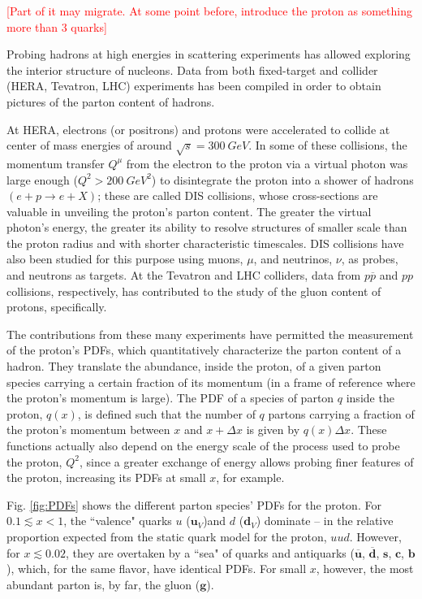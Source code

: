 \textcolor{red}{[Part of it may migrate. At some point before, introduce the proton as something more than 3 quarks]}

Probing hadrons at high energies in scattering experiments has allowed exploring the interior structure of nucleons. Data from  both fixed-target and collider (HERA, Tevatron, LHC) experiments has been compiled in order to obtain pictures of the parton content of hadrons. 

At HERA, electrons (or positrons) and protons were accelerated to collide at center of mass energies of around $\sqrt{s} = \qty{300}{GeV}$. In some of these collisions, the momentum transfer $Q^\mu$ from the electron to the proton via a virtual photon was large enough ($Q^2 > \qty{200}{GeV^2}$) to disintegrate the proton into a shower of hadrons $(e  + p \to e + X)$; these are called \gls{DIS} collisions, whose cross-sections are valuable in unveiling the proton's parton content. The greater the virtual photon's energy, the greater its ability to resolve structures of smaller scale than the proton radius and with shorter characteristic timescales. \gls{DIS} collisions have also been studied for this purpose using muons, $\mu$, and neutrinos, $\nu$, as probes, and neutrons as targets. At the Tevatron and LHC colliders, data from $p\overline{p}$ and $pp$ collisions, respectively, has contributed to the study of the gluon content of protons, specifically. \cite{Thomson8:2013}\cite{PDG_2024}

The contributions from these many experiments have permitted the measurement of the proton's \glspl{PDF}, which quantitatively characterize the parton content of a hadron. They translate the abundance, inside the proton, of a given parton species carrying a certain fraction of its momentum (in a frame of reference where the proton's momentum is large). The \gls{PDF} of a species of parton $q$ inside the proton, $q(x)$, is defined such that the number of $q$ partons carrying a fraction of the proton's momentum between $x$ and $x + \Delta x$ is given by $q(x)\Delta x$. These functions actually also depend on the energy scale of the process used to probe the proton, $Q^2$, since a greater exchange of energy allows probing finer features of the proton, increasing its \glspl{PDF} at small $x$, for example. \cite{Thomson8:2013}

Fig. \ref{fig:PDFs} shows the different parton species' \glspl{PDF} for the proton. For $0.1 \lesssim x < 1$, the ``valence" quarks $u$ ($\mathbf{u}_V$)and $d$ ($\mathbf{d}_V$) dominate -- in the relative proportion expected from the static quark model for the proton, $uud$. However, for $x \lesssim 0.02$, they are overtaken by a ``sea" of quarks and antiquarks ($\overline{\mathbf{u}}$, $\overline{\mathbf{d}}$, $\mathbf{s}$, $\mathbf{c}$, $\mathbf{b}$), which, for the same flavor, have identical \glspl{PDF}. For small $x$, however, the most abundant parton is, by far, the gluon ($\mathbf{g}$).

